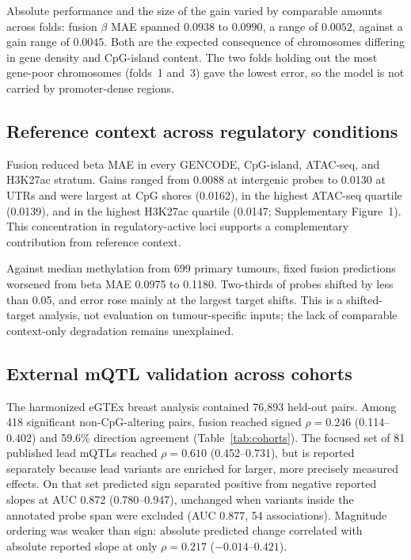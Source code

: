 \documentclass[10pt,letterpaper,twocolumn]{article}
\begin{document}
Absolute performance and the size of the gain varied by comparable amounts
across folds: fusion $\beta$ MAE spanned $0.0938$ to $0.0990$, a range of
$0.0052$, against a gain range of $0.0045$. Both are the expected consequence
of chromosomes differing in gene density and CpG-island content. The two folds
holding out the most gene-poor chromosomes (folds~1 and~3) gave the lowest
error, so the model is not carried by promoter-dense regions.

\color{black}
\subsection{Reference context across regulatory conditions}

Fusion reduced beta MAE in every GENCODE, CpG-island, ATAC-seq, and H3K27ac
stratum. Gains ranged from 0.0088 at intergenic probes to 0.0130 at UTRs and
were largest at CpG shores (0.0162), in the highest ATAC-seq quartile (0.0139),
and in the highest H3K27ac quartile (0.0147; Supplementary Figure~1). This
concentration in regulatory-active loci supports a complementary contribution
from reference context.



\label{sec:tumor-results}
{\color{addedred}
Against median methylation from 699 primary tumours, fixed fusion predictions
worsened from beta MAE 0.0975 to 0.1180. Two-thirds of probes shifted by less
than 0.05, and error rose mainly at the largest target shifts. This is a
shifted-target analysis, not evaluation on tumour-specific inputs; the lack of
comparable context-only degradation remains unexplained.
}

\subsection{External mQTL validation across cohorts}
\label{sec:genoa-results}
\color{addedred}

The harmonized eGTEx breast analysis contained 76{,}893 held-out pairs. Among
418 significant non-CpG-altering pairs, fusion reached signed $\rho=0.246$
(0.114--0.402) and 59.6\% direction agreement (Table~\ref{tab:cohorts}). The focused set of 81 published lead mQTLs reached $\rho=0.610$ (0.452--0.731),
but is reported separately because lead variants are enriched for larger, more
precisely measured effects. On that set predicted sign separated positive from
negative reported slopes at AUC 0.872 (0.780--0.947), unchanged when variants
inside the annotated probe span were excluded (AUC 0.877, 54 associations).
Magnitude ordering was weaker than sign: absolute predicted change correlated
with absolute reported slope at only $\rho=0.217$ ($-0.014$--$0.421$).
\end{document}
